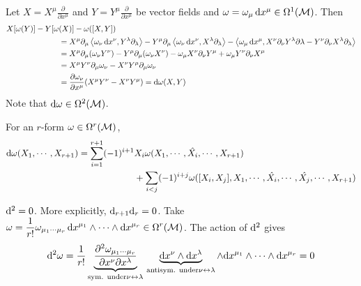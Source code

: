 \documentclass[a4paper, 10pt]{article}
\begin{document}
\newpage


\begin{obs}
    Let $\displaystyle{X = X^{\mu}\frac{\partial}{\partial{x}^{\mu}}}$ and $\displaystyle{Y = Y^{\mu}\frac{\partial}{\partial{x}^{\mu}}}$ be vector fields and $\omega = \omega_{\mu}\,\mathrm{d}{x}^{\mu} \in \Omega^{1}(\mathcal{M})$. Then
    \begin{align*}
        X[\omega(Y)] - Y[\omega&(X)] - \omega([X, Y]) \\
        &= X^{\mu}\partial_{\mu}\left<\omega_{\nu}\,\mathrm{d}{x}^{\nu}, Y^{\lambda}\partial_{\lambda}\right> - Y^{\mu}\partial_{\mu}\left<\omega_{\nu}\,\mathrm{d}{x}^{\nu}, X^{\lambda}\partial_{\lambda}\right> - \left<\omega_{\mu}\,\mathrm{d}{x}^{\mu}, X^{\nu}\partial_{\nu}Y^{\lambda}\partial\lambda - Y^{\nu}\partial_{\nu}X^{\lambda}\partial_{\lambda}\right> \\
        &= X^{\mu}\partial_{\mu}(\omega_{\nu}Y^{\nu}) - Y^{\mu}\partial_{\mu}(\omega_{\nu}X^{\nu}) - \omega_{\mu}X^{\nu}\partial_{\nu}Y^{\mu} + \omega_{\mu}Y^{\nu}\partial_{\nu}X^{\mu} \\
        &= X^{\mu}Y^{\nu}\partial_{\mu}\omega_{\nu} - X^{\nu}Y^{\mu}\partial_{\mu}\omega_{\nu} \\
        &= \frac{\partial\omega_{\nu}}{\partial{x}^{\mu}}(X^{\mu}Y^{\nu}-X^{\nu}Y^{\mu}) = \mathrm{d}\omega(X,Y)
    \end{align*}
    Note that $\mathrm{d}\omega \in \Omega^{2}(\mathcal{M})$.
\end{obs}

\begin{remark}
    For an $r$-form $\omega \in \Omega^{r}(\mathcal{M})$,
    \begin{align*}
        \mathrm{d}\omega(X_{1},\cdots,X_{r+1}) = \sum_{i=1}^{r+1}(-1)^{i+1}&X_{i}\omega(X_{1},\cdots,\hat{X_{i}},\cdots,X_{r+1}) \\
        &+ \sum_{i < j}(-1)^{i+j}\omega([X_{i},X_{j}], X_{1}, \cdots, \hat{X_{i}}, \cdots, \hat{X_{j}}, \cdots, X_{r+1})
    \end{align*}
    \textcolor{red}{}
\end{remark}

\begin{obs}
    $\mathrm{d}^{2} = 0$. More explicitly, $\mathrm{d}_{r+1}\mathrm{d}_{r} = 0$. Take $\displaystyle{\omega = \frac{1}{r!}\omega_{\mu_{1}\cdots\mu_{r}}\,\mathrm{d}{x}^{\mu_{1}}\wedge\cdots\wedge\mathrm{d}{x}^{\mu_{r}} \in \Omega^{r}(\mathcal{M})}$. The action of $\mathrm{d}^{2}$ gives
    \[ \mathrm{d}^{2}\omega = \frac{1}{r!}\underbrace{\frac{\partial^{2}\omega_{\mu_{1}\cdots\mu_{r}}}{\partial{x}^{\nu}\partial{x}^{\lambda}}}_{\text{sym. under} \nu\leftrightarrow\lambda}\,\underbrace{\mathrm{d}{x}^{\nu}\wedge\mathrm{d}{x}^{\lambda}}_{\text{antisym. under} \nu\leftrightarrow\lambda}\wedge\mathrm{d}{x}^{\mu_{1}}\wedge\cdots\wedge\mathrm{d}{x}^{\mu_{r}} = 0 \]
\end{obs}
\end{document}
